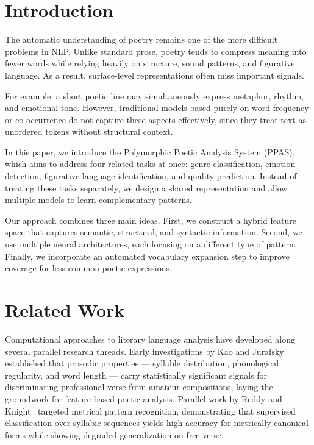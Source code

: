 \documentclass[conference]{IEEEtran}
\begin{document}
\section{Introduction}

The automatic understanding of poetry remains one of the more difficult
problems in NLP. Unlike standard prose, poetry tends to compress meaning
into fewer words while relying heavily on structure, sound patterns, and
figurative language. As a result, surface-level representations often miss
important signals.

For example, a short poetic line may simultaneously express metaphor,
rhythm, and emotional tone. However, traditional models based purely on
word frequency or co-occurrence do not capture these aspects effectively,
since they treat text as unordered tokens without structural context.

In this paper, we introduce the Polymorphic Poetic Analysis System (PPAS),
which aims to address four related tasks at once: genre classification,
emotion detection, figurative language identification, and quality
prediction. Instead of treating these tasks separately, we design a shared
representation and allow multiple models to learn complementary patterns.

Our approach combines three main ideas. First, we construct a hybrid
feature space that captures semantic, structural, and syntactic
information. Second, we use multiple neural architectures, each focusing
on a different type of pattern. Finally, we incorporate an automated
vocabulary expansion step to improve coverage for less common poetic
expressions.
\section{Related Work}
\label{sec:related}

Computational approaches to literary language analysis have developed
along several parallel research threads. Early investigations by Kao and
Jurafsky~\cite{kao2012} established that prosodic properties --- syllable
distribution, phonological regularity, and word length --- carry
statistically significant signals for discriminating professional verse
from amateur compositions, laying the groundwork for feature-based
poetic analysis. Parallel work by Reddy and Knight~\cite{reddy2011}
targeted metrical pattern recognition, demonstrating that supervised
classification over syllabic sequences yields high accuracy for
metrically canonical forms while showing degraded generalization on
free verse.
\end{document}
